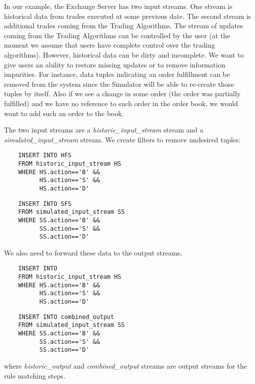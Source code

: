 \documentclass{article}
\begin{document}
In our example, the Exchange Server has two input streams. One stream is historical data from trades executed at some previous date. The second stream is additional trades coming from the Trading Algorithms. The stream of updates coming from the Trading Algorithms can be controlled by the user (at the moment we assume that users have complete control over the trading algorithms). However, historical data can be dirty and incomplete. We want to give users an ability to restore missing updates or to remove information impurities. For instance, data tuples indicating an order fulfillment can be removed from the system since the Simulator will be able to re-create those tuples by itself. Also if we see a change in some order (the order was partially fulfilled) and we have no reference to such order in the order book, we would want to add such an order to the book.%

The two input streams  are a \emph{historic\_input\_stream} stream and a \emph{simulated\_input\_stream} stream. We create filters to remove undesired tuples:

\begin{verbatim}   
    INSERT INTO HFS
    FROM historic_input_stream HS
    WHERE HS.action=='B' &&
          HS.action=='S' &&
          HS.action=='D'
\end{verbatim}

\begin{verbatim}  
    INSERT INTO SFS
    FROM simulated_input_stream SS
    WHERE SS.action=='B' &&
          SS.action=='S' &&
          SS.action=='D'
\end{verbatim}

\noindent We also need to forward these data to the output streams,

\begin{verbatim}   
    INSERT INTO  
    FROM historic_input_stream HS
    WHERE HS.action=='B' &&
          HS.action=='S' &&
          HS.action=='D'
\end{verbatim}

\begin{verbatim}  
    INSERT INTO combined_output
    FROM simulated_input_stream SS
    WHERE SS.action=='B' &&
          SS.action=='S' &&
          SS.action=='D'
\end{verbatim}

\noindent where \emph{historic\_output} and \emph{combined\_output} streams are output streams for the rule matching steps. 
\end{document}
